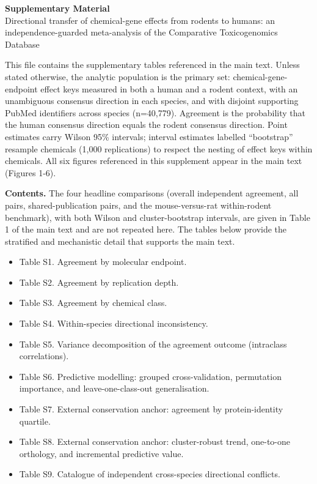 \documentclass[11pt]{elsarticle}
\begin{document}
\begin{center}
{\Large \textbf{Supplementary Material}}\\[6pt]
{\large Directional transfer of chemical-gene effects from rodents to humans:
an independence-guarded meta-analysis of the Comparative Toxicogenomics
Database}
\end{center}

\vspace{4pt}

\noindent This file contains the supplementary tables referenced in the main
text. Unless stated otherwise, the analytic population is the primary set:
chemical-gene-endpoint effect keys measured in both a human and a rodent
context, with an unambiguous consensus direction in each species, and with
disjoint supporting PubMed identifiers across species (n=40{,}779). Agreement is
the probability that the human consensus direction equals the rodent consensus
direction. Point estimates carry Wilson 95\% intervals; interval estimates
labelled ``bootstrap'' resample chemicals (1{,}000 replications) to respect the
nesting of effect keys within chemicals. All six figures referenced in this
supplement appear in the main text (Figures 1-6).

\vspace{6pt}

\noindent \textbf{Contents.} The four headline comparisons (overall independent
agreement, all pairs, shared-publication pairs, and the mouse-versus-rat
within-rodent benchmark), with both Wilson and cluster-bootstrap intervals, are
given in Table 1 of the main text and are not repeated here. The tables below
provide the stratified and mechanistic detail that supports the main text.

\begin{itemize}\itemsep2pt
\item Table S1. Agreement by molecular endpoint.
\item Table S2. Agreement by replication depth.
\item Table S3. Agreement by chemical class.
\item Table S4. Within-species directional inconsistency.
\item Table S5. Variance decomposition of the agreement outcome (intraclass correlations).
\item Table S6. Predictive modelling: grouped cross-validation, permutation importance, and leave-one-class-out generalisation.
\item Table S7. External conservation anchor: agreement by protein-identity quartile.
\item Table S8. External conservation anchor: cluster-robust trend, one-to-one orthology, and incremental predictive value.
\item Table S9. Catalogue of independent cross-species directional conflicts.
\end{itemize}
\end{document}
